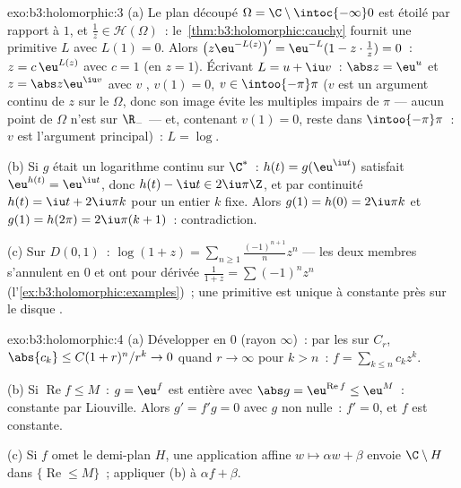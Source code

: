 \begin{solution}{exo:b3:holomorphic:3}
(a) Le plan découpé $\Omega = \C\setminus\intoc{-\infty}0$
est étoilé par rapport à $1$, et $\frac1z \in \mathcal
H(\Omega)$~: le~\cref{thm:b3:holomorphic:cauchy} fournit une
primitive $L$ avec $L(1) = 0$. Alors
$\bigl(z\eu^{-L(z)}\bigr)' = \eu^{-L}(1 - z\cdot\frac1z) =
0$~: $z = c\,\eu^{L(z)}$ avec $c = 1$ (en $z = 1$). Écrivant
$L = u + \iu v$~: $\abs z = \eu^u$ et $z = \abs z\eu^{\iu
v}$ avec $v$ , $v(1) = 0$, $v \in \intoo{-\pi}\pi$
($v$ est un argument continu de $z$ sur le  $\Omega$,
donc son image évite les multiples impairs de $\pi$ ---
aucun point de $\Omega$ n'est sur $\R_-$ --- et, contenant
$v(1) = 0$, reste dans $\intoo{-\pi}\pi$~: $v$ est
l'argument principal)~: $L = \log$.

(b) Si $g$ était un logarithme continu sur $\C^*$~: $h(t) =
g(\eu^{\iu t})$ satisfait $\eu^{h(t)} = \eu^{\iu t}$, donc
$h(t) - \iu t \in 2\iu\pi\Z$, et par continuité $h(t) = \iu
t + 2\iu\pi k$ pour un entier $k$ fixe. Alors $g(1) = h(0) =
2\iu\pi k$ et $g(1) = h(2\pi) = 2\iu\pi(k + 1)$~:
contradiction.

(c) Sur $D(0,1)$~: $\log(1 + z) =
\sum_{n\geq1}\frac{(-1)^{n+1}}{n}z^n$ --- les deux membres
s'annulent en $0$ et ont pour dérivée $\frac1{1+z} =
\sum(-1)^nz^n$ (l'\cref{ex:b3:holomorphic:examples})~; une
primitive est unique à constante près sur le disque
.
\end{solution}

\begin{solution}{exo:b3:holomorphic:4}
(a) Développer en $0$ (rayon $\infty$)~: par les  sur $C_r$, $\abs{c_k} \leq C(1 + r)^n/r^k \to 0$
quand $r \to \infty$ pour $k > n$~: $f = \sum_{k\leq
n}c_kz^k$.

(b) Si $\operatorname{Re}f \leq M$~: $g = \eu^f$ est entière
avec $\abs g = \eu^{\operatorname{Re}f} \leq \eu^M$~:
constante par Liouville. Alors $g' = f'g = 0$ avec $g$ non
nulle~: $f' = 0$, et $f$ est constante.

(c) Si $f$ omet le demi-plan $H$, une application affine $w
\mapsto \alpha w + \beta$ envoie $\C\setminus H$ dans
$\{\operatorname{Re} \leq M\}$~; appliquer (b) à $\alpha f +
\beta$.
\end{solution}

